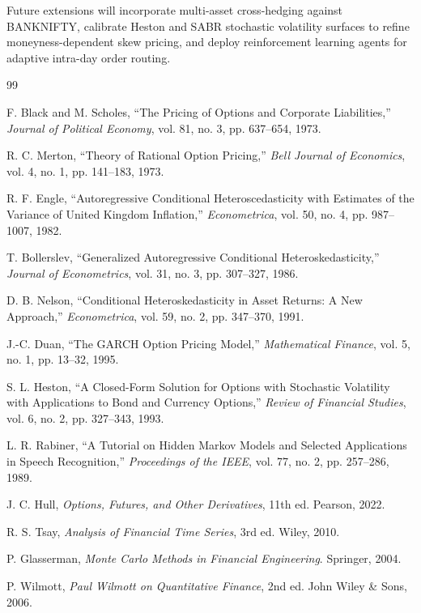 \documentclass[journal]{IEEEtran}
\begin{document}
Future extensions will incorporate multi-asset cross-hedging against BANKNIFTY, calibrate Heston and SABR stochastic volatility surfaces to refine moneyness-dependent skew pricing, and deploy reinforcement learning agents for adaptive intra-day order routing.

\begin{thebibliography}{99}

F. Black and M. Scholes, ``The Pricing of Options and Corporate Liabilities,'' \emph{Journal of Political Economy}, vol. 81, no. 3, pp. 637--654, 1973.

R. C. Merton, ``Theory of Rational Option Pricing,'' \emph{Bell Journal of Economics}, vol. 4, no. 1, pp. 141--183, 1973.

R. F. Engle, ``Autoregressive Conditional Heteroscedasticity with Estimates of the Variance of United Kingdom Inflation,'' \emph{Econometrica}, vol. 50, no. 4, pp. 987--1007, 1982.

T. Bollerslev, ``Generalized Autoregressive Conditional Heteroskedasticity,'' \emph{Journal of Econometrics}, vol. 31, no. 3, pp. 307--327, 1986.

D. B. Nelson, ``Conditional Heteroskedasticity in Asset Returns: A New Approach,'' \emph{Econometrica}, vol. 59, no. 2, pp. 347--370, 1991.

J.-C. Duan, ``The GARCH Option Pricing Model,'' \emph{Mathematical Finance}, vol. 5, no. 1, pp. 13--32, 1995.

S. L. Heston, ``A Closed-Form Solution for Options with Stochastic Volatility with Applications to Bond and Currency Options,'' \emph{Review of Financial Studies}, vol. 6, no. 2, pp. 327--343, 1993.

L. R. Rabiner, ``A Tutorial on Hidden Markov Models and Selected Applications in Speech Recognition,'' \emph{Proceedings of the IEEE}, vol. 77, no. 2, pp. 257--286, 1989.

J. C. Hull, \emph{Options, Futures, and Other Derivatives}, 11th ed. Pearson, 2022.

R. S. Tsay, \emph{Analysis of Financial Time Series}, 3rd ed. Wiley, 2010.

P. Glasserman, \emph{Monte Carlo Methods in Financial Engineering}. Springer, 2004.

P. Wilmott, \emph{Paul Wilmott on Quantitative Finance}, 2nd ed. John Wiley \& Sons, 2006.


\end{thebibliography}
\end{document}
